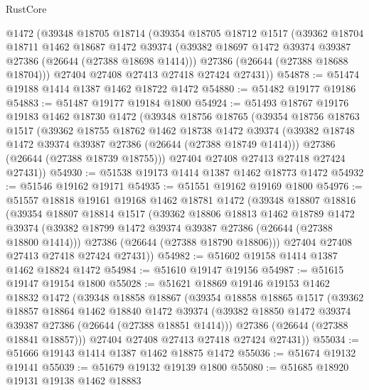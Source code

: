 \begin{lexlean}{RustCore}
\begin{coremodule}
    @1472
    (@39348
      @18705
      @18714
      (@39354
        @18705
        @18712
        @1517
        (@39362
          @18704
          @18711
          @1462
          @18687
          @1472
          @39374
          (@39382 @18697 @1472 @39374 @39387 @27386 (@26644 (@27388 @18698 @1414)))
          @27386
          (@26644 (@27388 @18688 @18704)))
        @27404
        @27408
        @27413
        @27418
        @27424
        @27431))
@54878 := @51474 @19188 @1414 @1387 @1462 @18722 @1472
@54880 := @51482 @19177 @19186
@54883 := @51487 @19177 @19184 @1800
@54924 := @51493
    @18767
    @19176
    @19183
    @1462
    @18730
    @1472
    (@39348
      @18756
      @18765
      (@39354
        @18756
        @18763
        @1517
        (@39362
          @18755
          @18762
          @1462
          @18738
          @1472
          @39374
          (@39382 @18748 @1472 @39374 @39387 @27386 (@26644 (@27388 @18749 @1414)))
          @27386
          (@26644 (@27388 @18739 @18755)))
        @27404
        @27408
        @27413
        @27418
        @27424
        @27431))
@54930 := @51538 @19173 @1414 @1387 @1462 @18773 @1472
@54932 := @51546 @19162 @19171
@54935 := @51551 @19162 @19169 @1800
@54976 := @51557
    @18818
    @19161
    @19168
    @1462
    @18781
    @1472
    (@39348
      @18807
      @18816
      (@39354
        @18807
        @18814
        @1517
        (@39362
          @18806
          @18813
          @1462
          @18789
          @1472
          @39374
          (@39382 @18799 @1472 @39374 @39387 @27386 (@26644 (@27388 @18800 @1414)))
          @27386
          (@26644 (@27388 @18790 @18806)))
        @27404
        @27408
        @27413
        @27418
        @27424
        @27431))
@54982 := @51602 @19158 @1414 @1387 @1462 @18824 @1472
@54984 := @51610 @19147 @19156
@54987 := @51615 @19147 @19154 @1800
@55028 := @51621
    @18869
    @19146
    @19153
    @1462
    @18832
    @1472
    (@39348
      @18858
      @18867
      (@39354
        @18858
        @18865
        @1517
        (@39362
          @18857
          @18864
          @1462
          @18840
          @1472
          @39374
          (@39382 @18850 @1472 @39374 @39387 @27386 (@26644 (@27388 @18851 @1414)))
          @27386
          (@26644 (@27388 @18841 @18857)))
        @27404
        @27408
        @27413
        @27418
        @27424
        @27431))
@55034 := @51666 @19143 @1414 @1387 @1462 @18875 @1472
@55036 := @51674 @19132 @19141
@55039 := @51679 @19132 @19139 @1800
@55080 := @51685
    @18920
    @19131
    @19138
    @1462
    @18883

\end{coremodule}
\end{lexlean}
